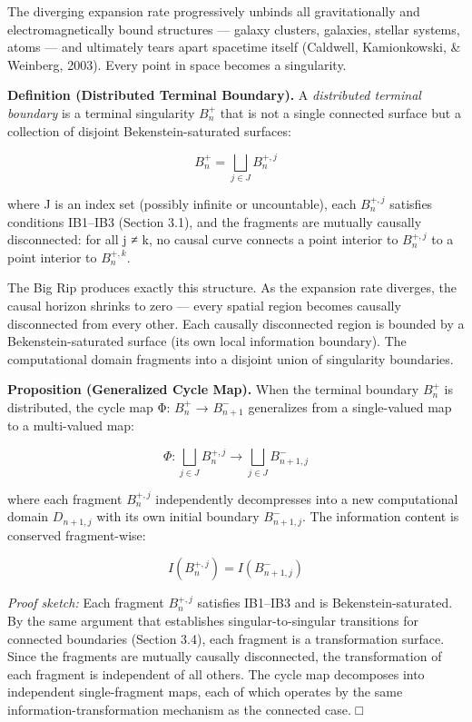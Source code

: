 \documentclass[
]{article}
\begin{document}
The diverging expansion rate progressively unbinds all gravitationally
and electromagnetically bound structures --- galaxy clusters, galaxies,
stellar systems, atoms --- and ultimately tears apart spacetime itself
(Caldwell, Kamionkowski, \& Weinberg, 2003). Every point in space
becomes a singularity.

\textbf{Definition (Distributed Terminal Boundary).} A \emph{distributed
terminal boundary} is a terminal singularity \(B_n^+\) that is not a
single connected surface but a collection of disjoint
Bekenstein-saturated surfaces:

\[B_n^+ = \bigsqcup_{j \in J} B_n^{+,j}\]

where J is an index set (possibly infinite or uncountable), each
\(B_n^{+,j}\) satisfies conditions IB1--IB3 (Section 3.1), and the
fragments are mutually causally disconnected: for all j ≠ k, no causal
curve connects a point interior to \(B_n^{+,j}\) to a point interior to
\(B_n^{+,k}\).

The Big Rip produces exactly this structure. As the expansion rate
diverges, the causal horizon shrinks to zero --- every spatial region
becomes causally disconnected from every other. Each causally
disconnected region is bounded by a Bekenstein-saturated surface (its
own local information boundary). The computational domain fragments into
a disjoint union of singularity boundaries.

\textbf{Proposition (Generalized Cycle Map).} When the terminal boundary
\(B_n^+\) is distributed, the cycle map Φ: \(B_n^+\) → \(B_{n+1}^-\)
generalizes from a single-valued map to a multi-valued map:

\[\Phi: \bigsqcup_{j \in J} B_n^{+,j} \to \bigsqcup_{j \in J} B_{n+1,j}^-\]

where each fragment \(B_n^{+,j}\) independently decompresses into a new
computational domain \(D_{n+1,j}\) with its own initial boundary
\(B_{n+1,j}^-\). The information content is conserved fragment-wise:

\[I(B_n^{+,j}) = I(B_{n+1,j}^-)\]

\emph{Proof sketch:} Each fragment \(B_n^{+,j}\) satisfies IB1--IB3 and
is Bekenstein-saturated. By the same argument that establishes
singular-to-singular transitions for connected boundaries (Section 3.4),
each fragment is a transformation surface. Since the fragments are
mutually causally disconnected, the transformation of each fragment is
independent of all others. The cycle map decomposes into independent
single-fragment maps, each of which operates by the same
information-transformation mechanism as the connected case. □
\end{document}
